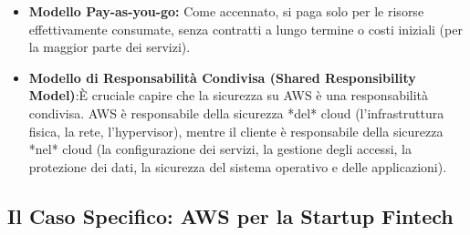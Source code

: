 \begin{itemize}
\begin{itemize}
        \end{itemize}
    \item \textbf{Modello Pay-as-you-go:} Come accennato, si paga solo per le risorse effettivamente consumate, senza contratti a lungo termine o costi iniziali (per la maggior parte dei servizi).
    \item \textbf{Modello di Responsabilità Condivisa (Shared Responsibility Model)}:È cruciale capire che la sicurezza su AWS è una responsabilità condivisa. AWS è responsabile della sicurezza *del* cloud (l'infrastruttura fisica, la rete, l'hypervisor), mentre il cliente è responsabile della sicurezza *nel* cloud (la configurazione dei servizi, la gestione degli accessi, la protezione dei dati, la sicurezza del sistema operativo e delle applicazioni).
\end{itemize}

\subsection{Il Caso Specifico: AWS per la Startup Fintech}
\label{sec:aws-for-fintech}

